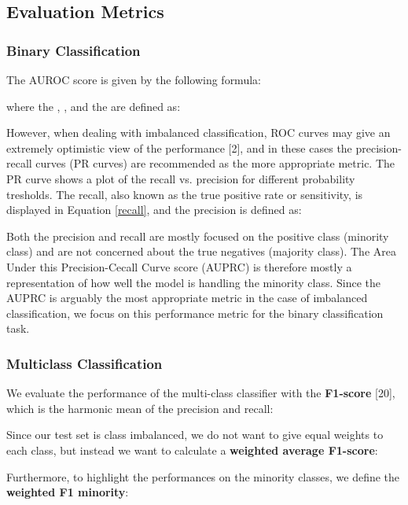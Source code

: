 \documentclass{article}
\begin{document}
\vspace{0.5cm}
\subsection{\large Evaluation Metrics}

\subsubsection*{\large Binary Classification}
The AUROC score is given by the following formula: 



\noindent where the , , and the  are defined as: 

 



 

\noindent However, when dealing with imbalanced classification, ROC curves may give an extremely optimistic view of the performance [2], and in these cases the precision-recall curves (PR curves) are recommended as the more appropriate metric. The PR curve shows a plot of the recall vs. precision for different probability tresholds. 
The recall, also known as the true positive rate or sensitivity, is displayed in Equation \ref{recall}, and the precision is defined as: 
 

\noindent Both the precision and recall are mostly focused on the positive class (minority class) and are not concerned about the true negatives (majority class). The Area Under this Precision-Cecall Curve score (AUPRC) is therefore mostly a representation of how well the model is handling the minority class. 
Since the AUPRC is arguably the most appropriate metric in the case of imbalanced classification, we focus on this performance metric for the binary classification task. 

\subsubsection*{\large Multiclass Classification}

We evaluate the performance of the multi-class classifier with the \textbf{F1-score} [20], which is the harmonic mean of the precision and recall:  



\noindent Since our test set is class imbalanced, we do not want to give equal weights to each class, but instead we want to calculate a \textbf{weighted average F1-score}:  
 

\noindent Furthermore, to highlight the performances on the minority classes, we define the \textbf{weighted F1 minority}:
  
\end{document}
